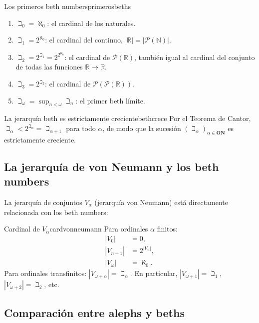\begin{ejemplo}{Los primeros beth numbers}{primerosbeths}
\begin{enumerate}[leftmargin=2em, label=(\alph*)]
  \item $\beth_0 = \aleph_0$: el cardinal de los naturales.
  \item $\beth_1 = 2^{\aleph_0}$: el cardinal del continuo, $|\mathbb{R}| = |\mathcal{P}(\mathbb{N})|$.
  \item $\beth_2 = 2^{\beth_1} = 2^{2^{\aleph_0}}$: el cardinal de $\mathcal{P}(\mathbb{R})$, también igual al cardinal del conjunto de todas las funciones $\mathbb{R} \to \mathbb{R}$.
  \item $\beth_3 = 2^{\beth_2}$: el cardinal de $\mathcal{P}(\mathcal{P}(\mathbb{R}))$.
  \item $\beth_\omega = \sup_{n < \omega} \beth_n$: el primer beth límite.
\end{enumerate}
\end{ejemplo}

\begin{observacion}{La jerarquía beth es estrictamente creciente}{bethcrece}
Por el Teorema de Cantor, $\beth_\alpha < 2^{\beth_\alpha} = \beth_{\alpha+1}$ para todo $\alpha$, de modo que la sucesión $(\beth_\alpha)_{\alpha \in \mathbf{ON}}$ es estrictamente creciente.
\end{observacion}

\subsection{La jerarquía de von Neumann y los beth numbers}

La jerarquía de conjuntos $V_\alpha$ (jerarquía von Neumann) está directamente relacionada con los beth numbers:

\begin{proposicion}{Cardinal de $V_\alpha$}{cardvonneumann}
Para ordinales $\alpha$ finitos:
\begin{align*}
  |V_0| &= 0, \\
  |V_{n+1}| &= 2^{|V_n|}, \\
  |V_\omega| &= \aleph_0.
\end{align*}
Para ordinales transfinitos: $|V_{\omega + \alpha}| = \beth_\alpha$. En particular, $|V_{\omega+1}| = \beth_1$, $|V_{\omega+2}| = \beth_2$, etc.
\end{proposicion}

\subsection{Comparación entre alephs y beths}

